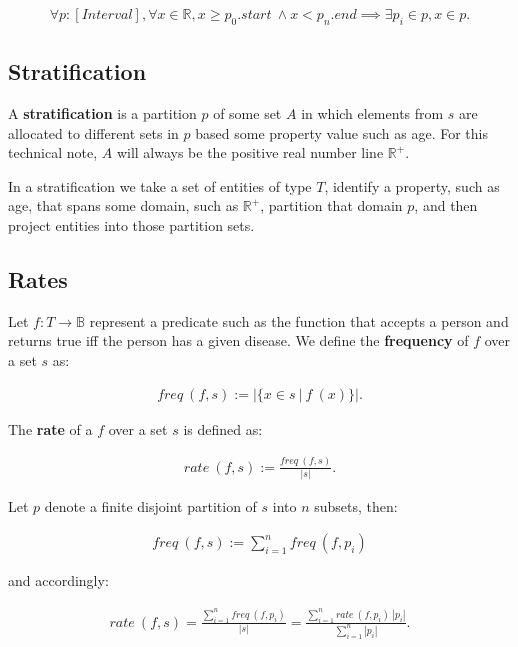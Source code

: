 \documentclass[]{article}
\begin{document}
\begin{align*}
\forall p : [Interval], \forall x \in \mathbb{R}, x \ge p_0.start\ \wedge x < p_n.end \implies \exists p_i \in p, x \in p.
\end{align*}

\hypertarget{stratification}{%
\subsection{Stratification}\label{stratification}}

A \textbf{stratification} is a partition \(p\) of some set \(A\) in
which elements from \(s\) are allocated to different sets in \(p\) based
some property value such as age. For this technical note, \(A\) will
always be the positive real number line \(\mathbb{R}^+\).

In a stratification we take a set of entities of type \(T\), identify a
property, such as age, that spans some domain, such as \(\mathbb{R}^+\),
partition that domain \(p\), and then project entities into those
partition sets.

\hypertarget{rates}{%
\subsection{Rates}\label{rates}}

Let \(f : T \rightarrow \mathbb{B}\) represent a predicate such as the
function that accepts a person and returns true iff the person has a
given disease. We define the \textbf{frequency} of \(f\) over a set
\(s\) as:

\begin{align*}
freq\ (f, s) := |\{x \in s\ |\ f\ (x)\}|.
\end{align*}

The \textbf{rate} of a \(f\) over a set \(s\) is defined as:

\begin{align*}
rate\ (f, s) := \frac{freq\ (f, s)}{|s|}.
\end{align*}

Let \(p\) denote a finite disjoint partition of \(s\) into \(n\)
subsets, then:

\begin{align*}
freq\ (f, s) := \sum_{i=1}^n freq\ (f, p_i)
\end{align*}

and accordingly:

\begin{align}
rate\ (f, s) = \frac{\sum_{i=1}^n freq\ (f, p_i)}{|s|} = \frac{\sum_{i=1}^n rate\ (f, p_i)\ |p_i|}{\sum_{i=1}^n|p_i|}.
\end{align}
\end{document}
